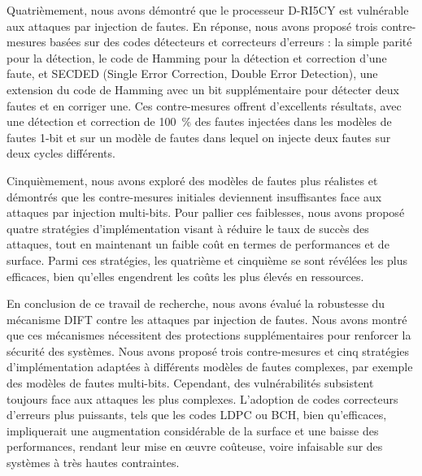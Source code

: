Quatrièmement, nous avons démontré que le processeur D-RI5CY est vulnérable aux attaques par injection de fautes. En réponse, nous avons proposé trois contre-mesures basées sur des codes détecteurs et correcteurs d’erreurs : la simple parité pour la détection, le code de Hamming pour la détection et correction d’une faute, et SECDED (Single Error Correction, Double Error Detection), une extension du code de Hamming avec un bit supplémentaire pour détecter deux fautes et en corriger une. Ces contre-mesures offrent d'excellents résultats, avec une détection et correction de 100~\% des fautes injectées dans les modèles de fautes 1-bit et sur un modèle de fautes dans lequel on injecte deux fautes sur deux cycles différents.

Cinquièmement, nous avons exploré des modèles de fautes plus réalistes et démontrés que les contre-mesures initiales deviennent insuffisantes face aux attaques par injection multi-bits. Pour pallier ces faiblesses, nous avons proposé quatre stratégies d'implémentation visant à réduire le taux de succès des attaques, tout en maintenant un faible coût en termes de performances et de surface. Parmi ces stratégies, les quatrième et cinquième se sont révélées les plus efficaces, bien qu’elles engendrent les coûts les plus élevés en ressources.

En conclusion de ce travail de recherche, nous avons évalué la robustesse du mécanisme DIFT contre les attaques par injection de fautes. Nous avons montré que ces mécanismes nécessitent des protections supplémentaires pour renforcer la sécurité des systèmes. Nous avons proposé trois contre-mesures et cinq stratégies d’implémentation adaptées à différents modèles de fautes complexes, par exemple des modèles de fautes multi-bits. Cependant, des vulnérabilités subsistent toujours face aux attaques les plus complexes. L’adoption de codes correcteurs d’erreurs plus puissants, tels que les codes LDPC ou BCH, bien qu’efficaces, impliquerait une augmentation considérable de la surface et une baisse des performances, rendant leur mise en œuvre coûteuse, voire infaisable sur des systèmes à très hautes contraintes.